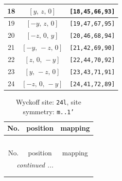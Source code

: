 \documentclass[fleqn,8pt]{jsarticle}
\begin{document}
\begin{longtable}{ccc}
18 & $\left[ y,\, z,\, 0 \right]$ & {\tt [18,45,66,93]} \\ \hline
19 & $\left[ - y,\, z,\, 0 \right]$ & {\tt [19,47,67,95]} \\ \hline
20 & $\left[ - z,\, 0,\, y \right]$ & {\tt [20,46,68,94]} \\ \hline
21 & $\left[ - y,\, - z,\, 0 \right]$ & {\tt [21,42,69,90]} \\ \hline
22 & $\left[ z,\, 0,\, - y \right]$ & {\tt [22,44,70,92]} \\ \hline
23 & $\left[ y,\, - z,\, 0 \right]$ & {\tt [23,43,71,91]} \\ \hline
24 & $\left[ - z,\, 0,\, - y \right]$ & {\tt [24,41,72,89]} \\
\end{longtable}
\renewcommand{\arraystretch}{1.2}
\begin{longtable}{ccc}
\caption{Wyckoff site: {\tt 24l}, site symmetry: {\tt m..1'}}
 \\
 \hline \hline
No. & position & mapping \\ \hline \endfirsthead

\multicolumn{2}{l}{\tablename\ \thetable{}} \\
 \hline \hline
No. & position & mapping \\ \hline \endhead

 \hline \hline
\multicolumn{2}{r}{\footnotesize\it continued ...} \\ \endfoot

 \hline \hline
\multicolumn{2}{r}{} \\ \endlastfoot


\end{longtable}
\end{document}
